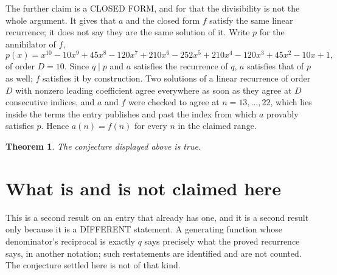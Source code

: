 \documentclass[11pt,a4paper]{article}
\theoremstyle{plain}
\newtheorem{theorem}{Theorem}
\theoremstyle{definition}
\begin{document}
The further claim is a CLOSED FORM, and for that the divisibility is not the whole argument. It
gives that $a$ and the closed form $f$ satisfy the same linear recurrence; it does not say they
are the same solution of it. Write $p$ for the annihilator of $f$,
\[
  p(x)=x^{10} - 10 x^{9} + 45 x^{8} - 120 x^{7} + 210 x^{6} - 252 x^{5} + 210 x^{4} - 120 x^{3} + 45 x^{2} - 10 x + 1 ,
\]
of order $D=10$. Since $q\mid p$ and $a$ satisfies the recurrence of $q$, $a$ satisfies that of
$p$ as well; $f$ satisfies it by construction. Two solutions of a linear recurrence of order $D$
with nonzero leading coefficient agree everywhere as soon as they agree at $D$ consecutive
indices, and $a$ and $f$ were checked to agree at $n=13,\dots,22$,
which lies inside the terms the entry publishes and past the index from which $a$ provably
satisfies $p$. Hence $a(n)=f(n)$ for every $n$ in the claimed range.

\begin{theorem}
The conjecture displayed above is true.
\end{theorem}

\section{What is and is not claimed here}

This is a second result on an entry that already has one, and it is a second result only because
it is a DIFFERENT statement. A generating function whose denominator's reciprocal is exactly $q$
says precisely what the proved recurrence says, in another notation; such restatements are
identified and are not counted. The conjecture settled here is not of that kind.
\end{document}
